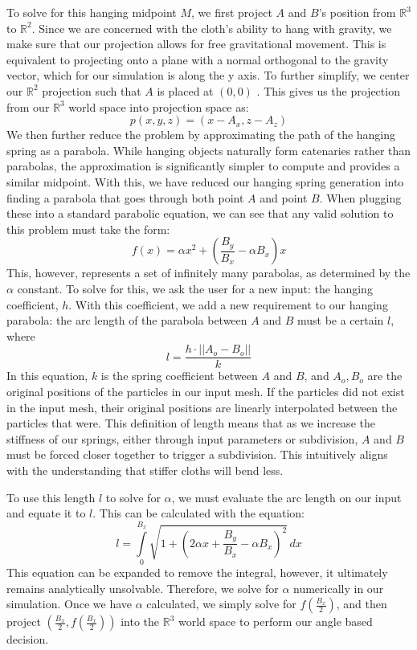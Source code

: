 \documentclass[sigconf]{acmart}
\begin{document}
To solve for this hanging midpoint $M$, we first project $A$ and $B$'s position from $\mathbb{R}^3$ to $\mathbb{R}^2$. Since we are concerned with the cloth's ability to hang with gravity, we make sure that our projection allows for free gravitational movement. This is equivalent to projecting onto a plane with a normal orthogonal to the gravity vector, which for our simulation is along the y axis. To further simplify, we center our $\mathbb{R}^2$ projection such that $A$ is placed at $(0,0)$ . This gives us the projection from our $\mathbb{R}^3$ world space into projection space as:
\[
p(x,y,z) = (x-A_x, z-A_z)
\] 
We then further reduce the problem by approximating the path of the hanging spring as a parabola. While hanging objects naturally form catenaries rather than parabolas, the approximation is significantly simpler to compute and provides a similar midpoint. With this, we have reduced our hanging spring generation into finding a parabola that goes through both point $A$ and point $B$. When plugging these into a standard parabolic equation, we can see that any valid solution to this problem must take the form:
\[
f(x) = \alpha x^2+\left(\frac{B_y}{B_x}-\alpha B_x\right)x
\]
This, however, represents a set of infinitely many parabolas, as determined by the $\alpha$ constant. To solve for this, we ask the user for a new input: the hanging coefficient, $h$. With this coefficient, we add a new requirement to our hanging parabola: the arc length of the parabola between $A$ and $B$ must be a certain $l$, where
\[ l= \frac{h\cdot ||A_o-B_o||}{k}\]
In this equation, $k$ is the spring coefficient between $A$ and $B$, and $A_o, B_o$ are the original positions of the particles in our input mesh. If the particles did not exist in the input mesh, their original positions are linearly interpolated between the particles that were. This definition of length means that as we increase the stiffness of our springs, either through input parameters or subdivision, $A$ and $B$ must be forced closer together to trigger a subdivision. This intuitively aligns with the understanding that stiffer cloths will bend less.

To use this length $l$ to solve for $\alpha$, we must evaluate the arc length on our input and equate it to $l$. This can be calculated with the equation:
\[
l = \int \limits_{0}^{B_x}\sqrt{1+(2\alpha x+\frac{B_y}{B_x}-\alpha B_x)^2}\,dx
\]
This equation can be expanded to remove the integral, however, it ultimately remains analytically unsolvable. Therefore, we solve for $\alpha$ numerically in our simulation. Once we have $\alpha$ calculated, we simply solve for $f\left(\frac{B_x}{2}\right)$, and then project $\left(\frac{B_x}{2},f(\frac{B_x}{2})\right)$ into the $\mathbb{R}^3$ world space to perform our angle based decision.
\end{document}
